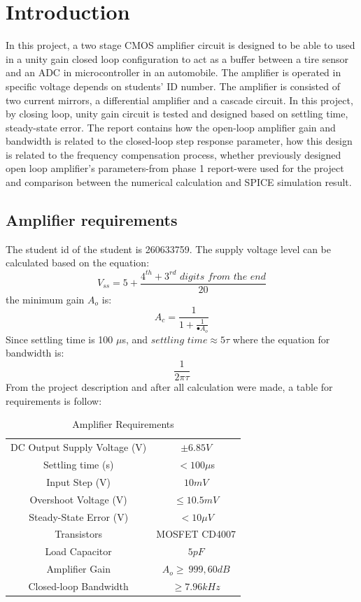 \documentclass[conference,compsoc]{IEEEtran}
\begin{document}
\IEEEpeerreviewmaketitle

\section{Introduction}
In this project, a two stage CMOS amplifier circuit is designed to be able to used in a unity gain closed loop configuration to act as a buffer between a tire sensor and an ADC in microcontroller in an automobile. The amplifier is operated in specific voltage depends on students' ID number. The amplifier is consisted of two current mirrors, a differential amplifier and a cascade circuit. In this project, by closing loop, unity gain circuit is tested and designed based on settling time, steady-state error. The report contains how the open-loop amplifier gain and bandwidth is related to the closed-loop step response parameter, how this design is related to the frequency compensation process, whether previously designed open loop amplifier's parameters-from phase 1 report-were used for the project and comparison between the numerical calculation and SPICE simulation result.

\subsection{Amplifier requirements}
The student id of the student is 260633759. The supply voltage level can be calculated based on the equation:\\
\[
V_{ss} = 5 + \frac{4^{th} + 3^{rd} \textit{ digits from the end} }{20}
\]
the minimum gain \(A_o\) is:\\
\[
A_c = \frac{1}{1 + \frac{1}{•A_o}}
\]
Since settling time is 100 \(\mu \)s, and \(\textit{settling time} \approx 5\tau\) where the equation for bandwidth is:\\
\[
\frac{1}{2\pi\tau}
\]
From the project description and after all calculation were made, a table for requirements is follow:\\
\begin{table}[!hbt]
	\centering
	\begin{tabular}{|c|c|}
	\hline
	DC Output Supply Voltage (V) & \(\pm 6.85V\)\\
	Settling time (s) & \(< 100 \mu \)s \\
	Input Step (V) & \(10 mV\)\\
	Overshoot Voltage (V) & \(\leq 10.5 mV\)\\
	Steady-State Error (V) & \(<10 \mu V\)\\
	Transistors & MOSFET CD4007\\
	Load Capacitor & \(5 pF\)\\
	Amplifier Gain & \(A_o \geq\ 999, 60 dB\)\\
	Closed-loop Bandwidth & \(\geq 7.96 kHz\)\\
	\hline
	\end{tabular}
	\caption{Amplifier Requirements}\label{table: 1}
\end{table}
\end{document}
